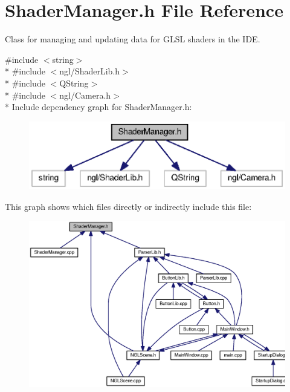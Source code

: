 \section{Shader\-Manager.\-h File Reference}
\label{_shader_manager_8h}


Class for managing and updating data for G\-L\-S\-L shaders in the I\-D\-E.  


{\ttfamily \#include $<$string$>$}\\*
{\ttfamily \#include $<$ngl/\-Shader\-Lib.\-h$>$}\\*
{\ttfamily \#include $<$Q\-String$>$}\\*
{\ttfamily \#include $<$ngl/\-Camera.\-h$>$}\\*
Include dependency graph for Shader\-Manager.\-h\-:\nopagebreak
\begin{figure}[H]
\begin{center}
\leavevmode
\includegraphics[width=346pt]{_shader_manager_8h__incl}
\end{center}
\end{figure}
This graph shows which files directly or indirectly include this file\-:
\nopagebreak
\begin{figure}[H]
\begin{center}
\leavevmode
\includegraphics[width=350pt]{_shader_manager_8h__dep__incl}
\end{center}
\end{figure}
